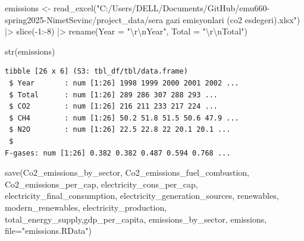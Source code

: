 \documentclass[
  letterpaper,
  DIV=11,
  numbers=noendperiod]{scrartcl}
\newenvironment{Shaded}{\begin{snugshade}}{\end{snugshade}}
\newcommand{\AttributeTok}[1]{\textcolor[rgb]{0.40,0.45,0.13}{#1}}
\newcommand{\DecValTok}[1]{\textcolor[rgb]{0.68,0.00,0.00}{#1}}
\newcommand{\FunctionTok}[1]{\textcolor[rgb]{0.28,0.35,0.67}{#1}}
\newcommand{\NormalTok}[1]{\textcolor[rgb]{0.00,0.23,0.31}{#1}}
\newcommand{\OtherTok}[1]{\textcolor[rgb]{0.00,0.23,0.31}{#1}}
\newcommand{\SpecialCharTok}[1]{\textcolor[rgb]{0.37,0.37,0.37}{#1}}
\newcommand{\StringTok}[1]{\textcolor[rgb]{0.13,0.47,0.30}{#1}}
\begin{document}
\begin{Shaded}
\begin{Highlighting}[]
\NormalTok{emissions }\OtherTok{\textless{}{-}} \FunctionTok{read\_excel}\NormalTok{(}\StringTok{"C:/Users/DELL/Documents/GitHub/emu660{-}spring2025{-}NimetSevinc/project\_data/sera gazi emisyonlari (co2 esdegeri).xlsx"}\NormalTok{) }\SpecialCharTok{|\textgreater{}} \FunctionTok{slice}\NormalTok{(}\SpecialCharTok{{-}}\DecValTok{1}\SpecialCharTok{:{-}}\DecValTok{8}\NormalTok{) }\SpecialCharTok{|\textgreater{}} \FunctionTok{rename}\NormalTok{(}\AttributeTok{Year =} \StringTok{"}\SpecialCharTok{\textbackslash{}r\textbackslash{}n}\StringTok{Year"}\NormalTok{, }\AttributeTok{Total =} \StringTok{"}\SpecialCharTok{\textbackslash{}r\textbackslash{}n}\StringTok{Total"}\NormalTok{)}

\FunctionTok{str}\NormalTok{(emissions)}
\end{Highlighting}
\end{Shaded}

\begin{verbatim}
tibble [26 x 6] (S3: tbl_df/tbl/data.frame)
 $ Year       : num [1:26] 1998 1999 2000 2001 2002 ...
 $ Total      : num [1:26] 289 286 307 288 293 ...
 $ CO2        : num [1:26] 216 211 233 217 224 ...
 $ CH4        : num [1:26] 50.2 51.8 51.5 50.6 47.9 ...
 $ N2O        : num [1:26] 22.5 22.8 22 20.1 20.1 ...
 $ 
F-gases: num [1:26] 0.382 0.382 0.487 0.594 0.768 ...
\end{verbatim}

\begin{Shaded}
\begin{Highlighting}[]
\FunctionTok{save}\NormalTok{(Co2\_emissions\_by\_sector, Co2\_emissions\_fuel\_combustion, Co2\_emissions\_per\_cap, electricity\_cons\_per\_cap, electricity\_final\_consumption, electricity\_generation\_sources, renewables, modern\_renewables, electricity\_production, total\_energy\_supply,gdp\_per\_capita, emissions\_by\_sector, emissions, }\AttributeTok{file=}\StringTok{"emissions.RData"}\NormalTok{)}
\end{Highlighting}
\end{Shaded}
\end{document}
